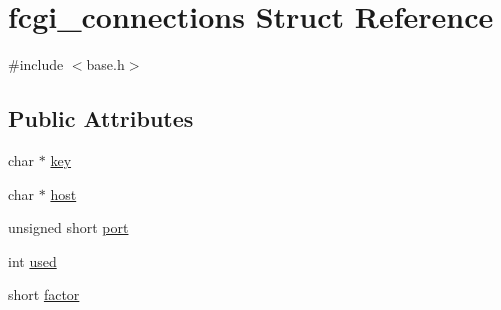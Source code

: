 \hypertarget{structfcgi__connections}{\section{fcgi\-\_\-connections Struct Reference}
\label{structfcgi__connections}
}


{\ttfamily \#include $<$base.\-h$>$}

\subsection*{Public Attributes}
\begin{DoxyCompactItemize}
\item 
char $\ast$ \hyperlink{structfcgi__connections_a3d3c1dfc85657caf413d5ff78d24c7f8}{key}
\item 
char $\ast$ \hyperlink{structfcgi__connections_acb12a28d6dd9ed9a65e58d55989f4b5c}{host}
\item 
unsigned short \hyperlink{structfcgi__connections_a5c37209105fad85c06a7c75163617360}{port}
\item 
int \hyperlink{structfcgi__connections_ae7ca640a3e5e7d35ed55623e46d3e9c9}{used}
\item 
short \hyperlink{structfcgi__connections_a94d4268a4c6b52356854e3804d7638f6}{factor}
\end{DoxyCompactItemize}


